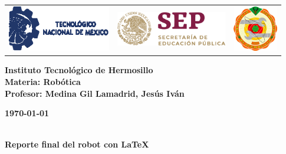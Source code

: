 \begin{titlepage}
	\centering
	\begin{tabular}{@{}p{} p{} p{}@{}}
		\includegraphics[height=2cm]{tecnm} & 
		\centering \includegraphics[height=1.5cm]{SEP} & 
		\raggedleft \includegraphics[height=2cm]{ith.jpg} \\
	\end{tabular}
	
	\vspace{2em}
	
	\noindent
	\begin{minipage}[t]{0.6\textwidth}
		\raggedright
		\small \textbf{%
			Instituto Tecnológico de Hermosillo\\
			Materia: Robótica\\
			Profesor: Medina Gil Lamadrid, Jesús Iván%
		}
	\end{minipage}%
	\hfill
	\begin{minipage}[t]{0.3\textwidth}
		\raggedleft
		\small \textbf{\today}
	\end{minipage}
	
	\vspace{2em}
	
	{\large \textbf{}}\\
	{\Huge \textbf{Reporte final del robot con \LaTeX}}
		
	\vspace{1em}
	

\end{titlepage}

